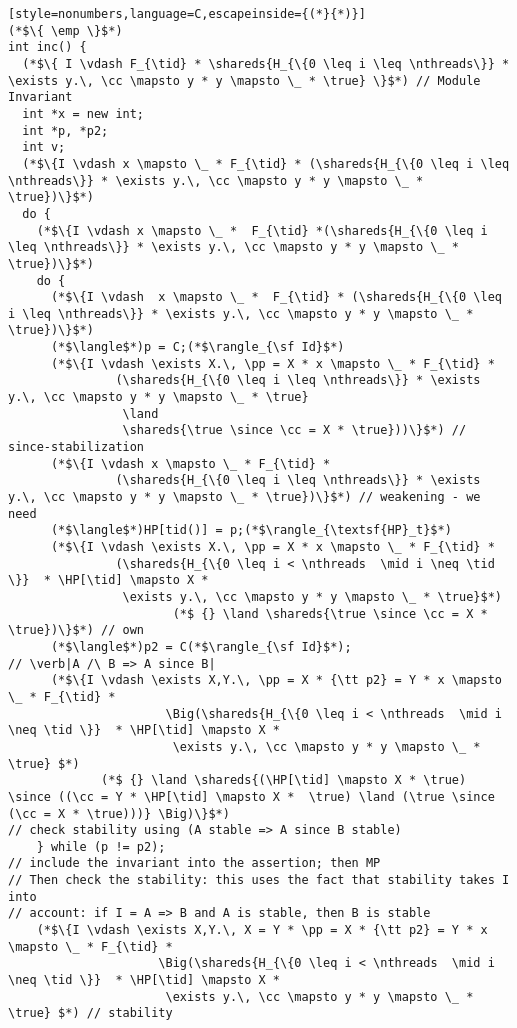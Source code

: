 \begin{figure*}
{\begin{lstlisting}[style=nonumbers,language=C,escapeinside={(*}{*)}]
(*$\{ \emp \}$*)
int inc() {
  (*$\{ I \vdash F_{\tid} * \shareds{H_{\{0 \leq i \leq \nthreads\}} * \exists y.\, \cc \mapsto y * y \mapsto \_ * \true} \}$*) // Module Invariant
  int *x = new int;
  int *p, *p2;
  int v;
  (*$\{I \vdash x \mapsto \_ * F_{\tid} * (\shareds{H_{\{0 \leq i \leq \nthreads\}} * \exists y.\, \cc \mapsto y * y \mapsto \_ * \true})\}$*)
  do {
    (*$\{I \vdash x \mapsto \_ *  F_{\tid} *(\shareds{H_{\{0 \leq i \leq \nthreads\}} * \exists y.\, \cc \mapsto y * y \mapsto \_ * \true})\}$*)
    do {
      (*$\{I \vdash  x \mapsto \_ *  F_{\tid} * (\shareds{H_{\{0 \leq i \leq \nthreads\}} * \exists y.\, \cc \mapsto y * y \mapsto \_ * \true})\}$*)
      (*$\langle$*)p = C;(*$\rangle_{\sf Id}$*)
      (*$\{I \vdash \exists X.\, \pp = X * x \mapsto \_ * F_{\tid} * 
               (\shareds{H_{\{0 \leq i \leq \nthreads\}} * \exists y.\, \cc \mapsto y * y \mapsto \_ * \true} 
                \land 
                \shareds{\true \since \cc = X * \true}))\}$*) // since-stabilization
      (*$\{I \vdash x \mapsto \_ * F_{\tid} * 
               (\shareds{H_{\{0 \leq i \leq \nthreads\}} * \exists y.\, \cc \mapsto y * y \mapsto \_ * \true})\}$*) // weakening - we need
      (*$\langle$*)HP[tid()] = p;(*$\rangle_{\textsf{HP}_t}$*)
      (*$\{I \vdash \exists X.\, \pp = X * x \mapsto \_ * F_{\tid} * 
               (\shareds{H_{\{0 \leq i < \nthreads  \mid i \neq \tid \}}  * \HP[\tid] \mapsto X *
                \exists y.\, \cc \mapsto y * y \mapsto \_ * \true}$*) 
                       (*$ {} \land \shareds{\true \since \cc = X * \true})\}$*) // own
      (*$\langle$*)p2 = C(*$\rangle_{\sf Id}$*);
// \verb|A /\ B => A since B|
      (*$\{I \vdash \exists X,Y.\, \pp = X * {\tt p2} = Y * x \mapsto \_ * F_{\tid} * 
                      \Big(\shareds{H_{\{0 \leq i < \nthreads  \mid i \neq \tid \}}  * \HP[\tid] \mapsto X *
                       \exists y.\, \cc \mapsto y * y \mapsto \_ * \true} $*)             
             (*$ {} \land \shareds{(\HP[\tid] \mapsto X * \true) \since ((\cc = Y * \HP[\tid] \mapsto X *  \true) \land (\true \since (\cc = X * \true)))} \Big)\}$*)
// check stability using (A stable => A since B stable)
    } while (p != p2);
// include the invariant into the assertion; then MP
// Then check the stability: this uses the fact that stability takes I into 
// account: if I = A => B and A is stable, then B is stable
    (*$\{I \vdash \exists X,Y.\, X = Y * \pp = X * {\tt p2} = Y * x \mapsto \_ * F_{\tid} * 
                     \Big(\shareds{H_{\{0 \leq i < \nthreads  \mid i \neq \tid \}}  * \HP[\tid] \mapsto X *
                      \exists y.\, \cc \mapsto y * y \mapsto \_ * \true} $*) // stability             

\end{lstlisting}}
\end{figure*}
